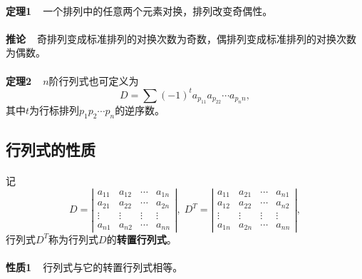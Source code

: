 \paragraph{}
\textbf{定理1~~}一个排列中的任意两个元素对换，排列改变奇偶性。

\paragraph{}
\textbf{推论~~}奇排列变成标准排列的对换次数为奇数，偶排列变成标准排列的对换次数为偶数。

\paragraph{}
\textbf{定理2~~}$n$阶行列式也可定义为
\begin{equation*}
  D = \sum(-1)^ta_{p_11}a_{p_22}\cdots a_{p_nn},
\end{equation*}
其中$t$为行标排列$p_1p_2\cdots p_n$的逆序数。

\subsection{行列式的性质}
\paragraph{}
记
\begin{equation*}
  D = \left|\begin{array}{cccc}
    a_{11} & a_{12} & \cdots & a_{1n} \\
    a_{21} & a_{22} & \cdots & a_{2n} \\
    \vdots & \vdots & \vdots & \vdots \\
    a_{n1} & a_{n2} & \cdots & a_{nn}
  \end{array} \right|, \;
  D^T = \left|\begin{array}{cccc}
    a_{11} & a_{21} & \cdots & a_{n1} \\
    a_{12} & a_{22} & \cdots & a_{n2} \\
    \vdots & \vdots & \vdots & \vdots \\
    a_{1n} & a_{2n} & \cdots & a_{nn}
  \end{array} \right|,
\end{equation*}
行列式$D^T$称为行列式$D$的\textbf{转置行列式}。

\paragraph{}
\textbf{性质1~~}行列式与它的转置行列式相等。

